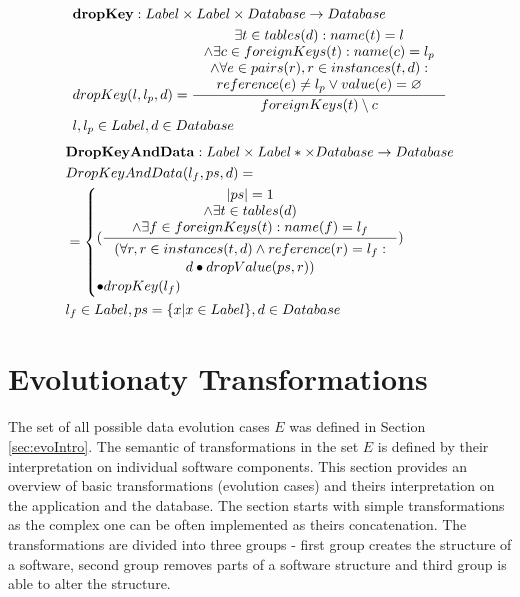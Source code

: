 \documentclass[11pt]{article}
\begin{document}
\begin{align*}
&	\mathbf{dropKey} : Label \times Label \times Database \rightarrow Database \\
&	dropKey(l, l_p, d) = \inference{ \exists t \in tables(d) : name(t) = l \\ \wedge \exists c \in foreignKeys(t) : name(c) = l_p \\ \wedge \forall e \in  pairs(r), r \in instances(t, d) : \\ reference(e) \neq l_p \vee value(e) = \varnothing  }{foreignKeys(t) \setminus c}\\
&	 l, l_p \in Label, d \in Database 
\end{align*}
\begin{align*}
&	\mathbf{DropKeyAndData} : Label \times Label* \times Database \rightarrow Database \\
&	DropKeyAndData(l_f, ps, d) = \\
& = \begin{cases}
 	(\inference{|ps| = 1 \\ \wedge \exists t \in tables(d) \\ \wedge \exists f \in foreignKeys(t) : name(f) = l_f}{\begin{gathered}
	 	(\forall r, r \in instances(t,d) \wedge reference(r) = l_f: \\d \bullet dropValue(ps, r)) \end{gathered}}) \\ \bullet dropKey(l_f)  
 \end{cases}
	\\
&	l_f \in Label, ps = \{x | x \in Label \}, d \in Database
\end{align*}



\section{Evolutionaty Transformations}
\label{sec:Evolutionaty-Transformations}
The set of all possible data evolution cases $E$ was defined in Section \ref{sec:evoIntro}. The semantic of transformations in the set $E$ is defined by their interpretation on individual software components. This section provides an overview of basic transformations (evolution cases) and theirs interpretation on the application and the database. The section starts with simple transformations as the complex one can be often implemented as theirs concatenation. The transformations are divided into three groups - first group creates the structure of a software, second group removes parts of a software structure and third group is able to alter the structure.
\end{document}
